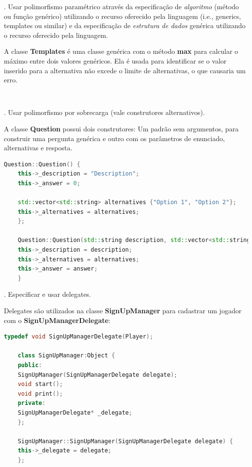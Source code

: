 \documentclass[rel_mlp]{iiufrgs}
\begin{document}
\begin{itemize}
	. Usar polimorfismo paramétrico
	através da especificação de \textit{algoritmo} (método ou função genérico) utilizando o recurso oferecido pela linguagem (i.e., generics, templates ou similar)
	e da especificação de \textit{estrutura de dados} genérica utilizando o recurso oferecido pela linguagem.
	
	A classe \textbf{Templates} é uma classe genérica com o método \textbf{max} para calcular o máximo entre dois valores genéricos. Ela é usada para identificar se o valor inserido para a alternativa não excede o limite de alternativas, o que causaria um erro.
	
	\begin{lstlisting}[language=C++, caption={Proteção de dados inválidos}]
	
	\end{lstlisting}
	
	. Usar polimorfismo por sobrecarga (vale construtores alternativos).
	
	A classe \textbf{Question} possui dois construtores: Um padrão sem argumentos, para construir uma pergunta genérica e outro com os parâmetros de enunciado, alternativas e resposta.
	
	\begin{lstlisting}[language=C++, caption={Construtores da classe Question}]
	Question::Question() {
	this->_description = "Description";
	this->_answer = 0;
	
	std::vector<std::string> alternatives {"Option 1", "Option 2"};
	this->_alternatives = alternatives;
	};
	
	Question::Question(std::string description, std::vector<std::string> alternatives, int answer) {
	this->_description = description;
	this->_alternatives = alternatives;
	this->_answer = answer;
	}
	\end{lstlisting}
	
	. Especificar e usar delegates.
	
	Delegates são utilizados na classe \textbf{SignUpManager} para cadastrar um jogador com o \textbf{SignUpManagerDelegate}:
	
	\begin{lstlisting}[language=C++, caption={Uso de delegate}]
	typedef void SignUpManagerDelegate(Player);
	
	class SignUpManager:Object {
	public:
	SignUpManager(SignUpManagerDelegate delegate);
	void start();
	void print();
	private:
	SignUpManagerDelegate* _delegate;
	};
	
	SignUpManager::SignUpManager(SignUpManagerDelegate delegate) {
	this->_delegate = delegate;
	};
	

\end{lstlisting}
\end{itemize}
\end{document}
